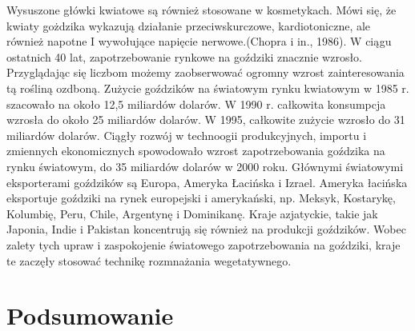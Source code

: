\documentclass[two column, twoside, a4paper]{article}
\begin{document}
Wysuszone główki kwiatowe są również stosowane w kosmetykach. Mówi się, że kwiaty gożdzika wykazują działanie przeciwskurczowe, kardiotoniczne, ale również napotne I wywołujące napięcie nerwowe.(Chopra i in., 1986).
W ciągu ostatnich 40 lat, zapotrzebowanie rynkowe na goździki znacznie wzrosło. Przyglądając się liczbom możemy zaobserwować ogromny wzrost zainteresowania tą rośliną ozdboną. Zużycie goździków na światowym rynku kwiatowym w 1985 r. szacowało na  około 12,5 miliardów dolarów. W 1990 r. całkowita konsumpcja wzrosła do około 25 miliardów dolarów. W 1995, całkowite zużycie wzrosło do 31 miliardów dolarów. Ciągły rozwój w technoogii produkcyjnych, importu i zmiennych ekonomicznych spowodowało wzrost zapotrzebowania goździka na rynku światowym, do 35 miliardów dolarów w 2000 roku.
Głównymi światowymi eksporterami goździków są Europa, Ameryka Łacińska i Izrael.
Ameryka łacińska eksportuje goździki na rynek europejski i amerykański, np. Meksyk, Kostarykę, Kolumbię, Peru, Chile, Argentynę i Dominikanę. Kraje azjatyckie, takie jak Japonia, Indie i Pakistan koncentrują się również na produkcji goździków. Wobec
zalety tych upraw i zaspokojenie światowego zapotrzebowania na goździki, kraje te zaczęły stosować technikę rozmnażania wegetatywnego.

\section{Podsumowanie}

\nocite{Mulcahy1875, Jain1997, Gutierrez2010, Fraga2004, Forkmann1980, Casas2009, Ahmadian2017}
\printbibliography
\end{document}
